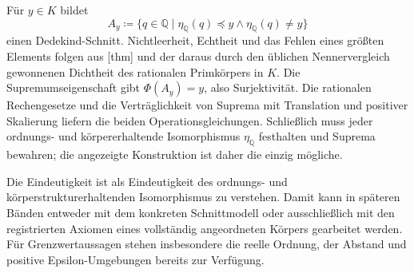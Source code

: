 \documentclass[main.tex]{subfiles}
\begin{document}
Für \(y\in K\) bildet
\[
  A_y\coloneqq
  \{q\in\mathbb Q\mid
    \eta_{\mathbb Q}(q)\preccurlyeq y
    \land\eta_{\mathbb Q}(q)\neq y\}
\]
einen Dedekind-Schnitt. Nichtleerheit, Echtheit und das Fehlen eines größten
Elements folgen aus
[thm] und der daraus durch den
üblichen Nennervergleich gewonnenen Dichtheit des rationalen Primkörpers in
\(K\). Die Supremumseigenschaft gibt \(\Phi(A_y)=y\), also Surjektivität.
Die rationalen Rechengesetze und die Verträglichkeit von Suprema mit
Translation und positiver Skalierung liefern die beiden Operationsgleichungen.
Schließlich muss jeder ordnungs- und körpererhaltende Isomorphismus
\(\eta_{\mathbb Q}\) festhalten und Suprema bewahren; die angezeigte
Konstruktion ist daher die einzig mögliche.

Die Eindeutigkeit ist als Eindeutigkeit des ordnungs- und
körperstrukturerhaltenden Isomorphismus zu verstehen. Damit kann in späteren
Bänden entweder mit dem konkreten Schnittmodell oder ausschließlich mit den
registrierten Axiomen eines vollständig angeordneten Körpers gearbeitet
werden. Für Grenzwertaussagen stehen insbesondere die reelle Ordnung, der
Abstand und positive Epsilon-Umgebungen bereits zur Verfügung.
\end{document}
